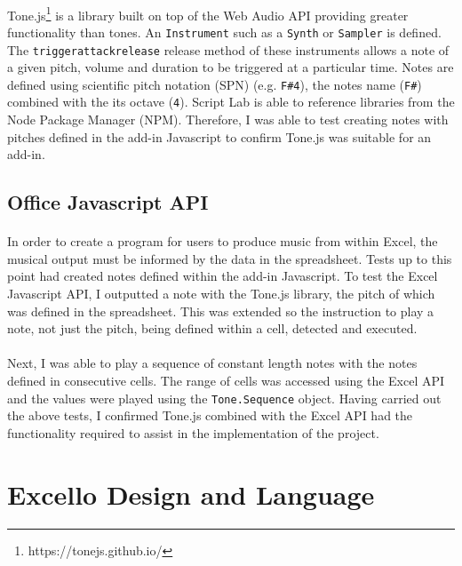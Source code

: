 \paragraph{} Tone.js\footnote{https://tonejs.github.io/} is a library built on top of the Web Audio API providing greater functionality than tones. An \texttt{Instrument} such as a \texttt{Synth} or \texttt{Sampler} is defined. The \texttt{triggerattackrelease} release method of these instruments allows a note of a given pitch, volume and duration to be triggered at a particular time. Notes are defined using scientific pitch notation (SPN) (e.g. \texttt{F\#4}), the notes name (\texttt{F\#}) combined with the its octave (\texttt{4}). Script Lab is able to reference libraries from the Node Package Manager (NPM). Therefore, I was able to test creating notes with pitches defined in the add-in Javascript to confirm Tone.js was suitable for an add-in.

\subsection{Office Javascript API}

\paragraph{} In order to create a program for users to produce music from within Excel, the musical output must be informed by the data in the spreadsheet. Tests up to this point had created notes defined within the add-in Javascript. To test the Excel Javascript API, I outputted a note with the Tone.js library, the pitch of which was defined in the spreadsheet. This was extended so the instruction to play a note, not just the pitch, being defined within a cell, detected and executed.

\paragraph{} Next, I was able to play a sequence of constant length notes with the notes defined in consecutive cells.  The range of cells was accessed using the Excel API and the values were played using the \texttt{Tone.Sequence} object. Having carried out the above tests, I confirmed Tone.js combined with the Excel API had the functionality required to assist in the implementation of the project.

\section{Excello Design and Language}

